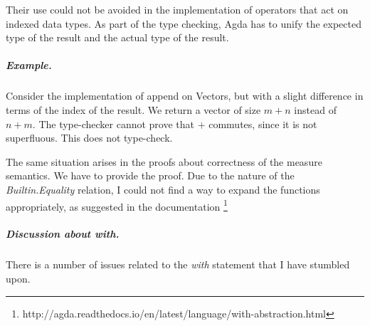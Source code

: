 \documentclass[12pt,twoside,notitlepage]{report}
\newcommand{\Conid}[1]{\mathit{#1}}
\newcommand{\Varid}[1]{\mathit{#1}}
\def\resethooks{%
  \global\let\SaveRestoreHook\empty
  \global\let\ColumnHook\empty}
\newcommand{\hsindent}[1]{\quad}%
\let\hspre\empty
\let\hspost\empty
\begin{document}
Their use could not be avoided in the implementation of operators that act on indexed data types. As part of the type checking, Agda has to unify the expected type of the result and the actual type of the result. 

\subparagraph{Example.} Consider the implementation of append on Vectors, but with a slight difference in terms of the index of the result. We return a vector of size $m + n$ instead of $n + m$. The type-checker cannot prove that  $+$ commutes, since it is not superfluous. This does not type-check.

\resethooks

The same situation arises in the proofs about correctness of the measure semantics. We have to provide the proof. Due to the nature of the \textit{Builtin.Equality} relation, I could not find a way to expand the functions appropriately, as suggested in the documentation \footnote{http://agda.readthedocs.io/en/latest/language/with-abstraction.html}


\subparagraph{Discussion about \textit{with}.}There is a number of issues related to the \textit{with} statement that I have stumbled upon.
\end{document}
